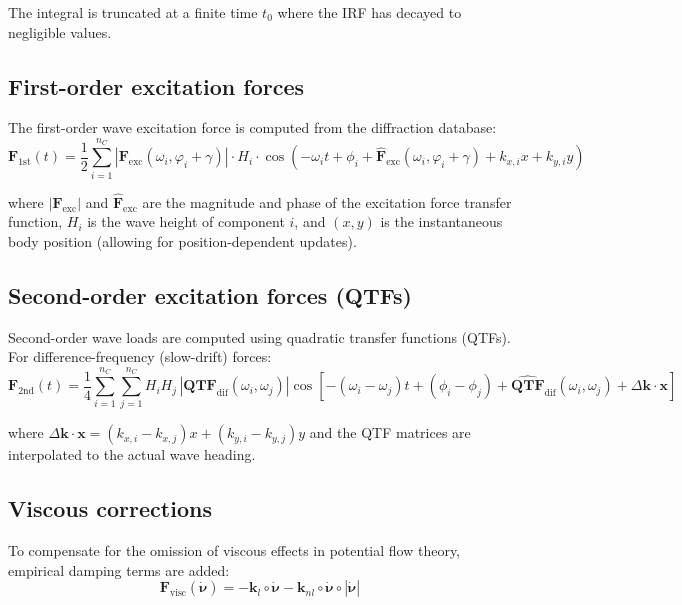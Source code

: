 \documentclass[11pt]{article}
\begin{document}
The integral is truncated at a finite time $t_0$ where the IRF has decayed to negligible values.

\subsection{First-order excitation forces}

The first-order wave excitation force is computed from the diffraction database:
\begin{equation}
\mathbf{F}_{1\text{st}}(t) = \frac{1}{2}\sum_{i=1}^{n_C}|\mathbf{F}_{\text{exc}}(\omega_i,\varphi_i+\gamma)|\cdot H_i\cdot\cos\left(-\omega_i t + \phi_i + \hat{\mathbf{F}}_{\text{exc}}(\omega_i,\varphi_i+\gamma) + k_{x,i}x + k_{y,i}y\right)
\end{equation}

where $|\mathbf{F}_{\text{exc}}|$ and $\hat{\mathbf{F}}_{\text{exc}}$ are the magnitude and phase of the excitation force transfer function, $H_i$ is the wave height of component $i$, and $(x,y)$ is the instantaneous body position (allowing for position-dependent updates).

\subsection{Second-order excitation forces (QTFs)}

Second-order wave loads are computed using quadratic transfer functions (QTFs). For difference-frequency (slow-drift) forces:
\begin{equation}
\mathbf{F}_{2\text{nd}}(t) = \frac{1}{4}\sum_{i=1}^{n_C}\sum_{j=1}^{n_C}H_i H_j\,|\mathbf{QTF}_{\text{dif}}(\omega_i,\omega_j)|\cos\left[-(\omega_i-\omega_j)t + (\phi_i-\phi_j) + \widehat{\mathbf{QTF}}_{\text{dif}}(\omega_i,\omega_j) + \Delta\mathbf{k}\cdot\mathbf{x}\right]
\end{equation}

where $\Delta\mathbf{k}\cdot\mathbf{x} = (k_{x,i}-k_{x,j})x + (k_{y,i}-k_{y,j})y$ and the QTF matrices are interpolated to the actual wave heading.

\subsection{Viscous corrections}

To compensate for the omission of viscous effects in potential flow theory, empirical damping terms are added:
\begin{equation}
\mathbf{F}_{\text{visc}}(\dot{\boldsymbol{\nu}}) = -\mathbf{k}_l\circ\dot{\boldsymbol{\nu}} - \mathbf{k}_{nl}\circ\dot{\boldsymbol{\nu}}\circ|\dot{\boldsymbol{\nu}}|
\end{equation}
\end{document}
